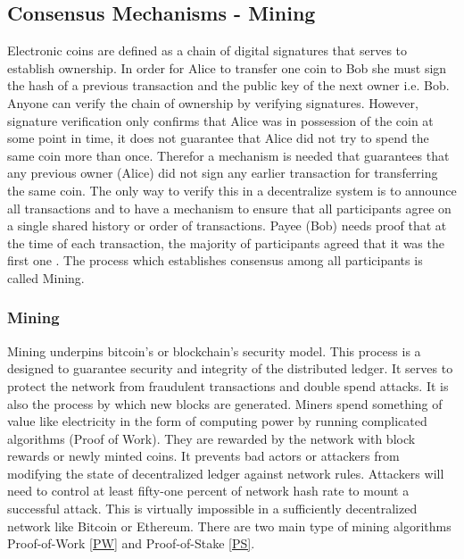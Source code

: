 \subsection{Consensus Mechanisms - Mining} \label{Mining}
Electronic coins are defined as a chain of digital signatures that serves to establish ownership. In order for Alice to transfer one coin to Bob she must sign the hash of a previous transaction and the public key of the next owner i.e. Bob. Anyone can verify the chain of ownership by verifying signatures. However, signature verification only confirms that Alice was in possession of the coin at some point in time, it does not guarantee that Alice did not try to spend the same coin more than once.  Therefor a mechanism is needed that guarantees that any previous owner (Alice) did not sign any earlier transaction for transferring the same coin. The only way to verify this in a decentralize system is to announce all transactions and to have a mechanism to ensure that all participants agree on a single shared history or order of transactions. Payee (Bob) needs proof that at the time of each transaction, the majority of participants agreed that it was the first one \cite{paper:001}. The process which establishes consensus among all participants is called Mining.
\subsubsection{Mining}
Mining underpins bitcoin’s or blockchain’s security model. This process is a designed to guarantee security and integrity of the distributed ledger. It serves to protect the network from fraudulent transactions and double spend attacks. It is also the process by which new blocks are generated. Miners spend something of value like electricity in the form of computing power by running complicated algorithms (Proof of Work). They are rewarded by the network with block rewards or newly minted coins. It prevents bad actors or attackers from modifying the state of decentralized ledger against network rules. Attackers will need to control at least fifty-one percent of network hash rate to mount a successful attack. This is virtually impossible in a sufficiently decentralized network like Bitcoin or Ethereum. There are two main type of mining algorithms Proof-of-Work \ref{PW} and Proof-of-Stake \ref{PS}.
  

